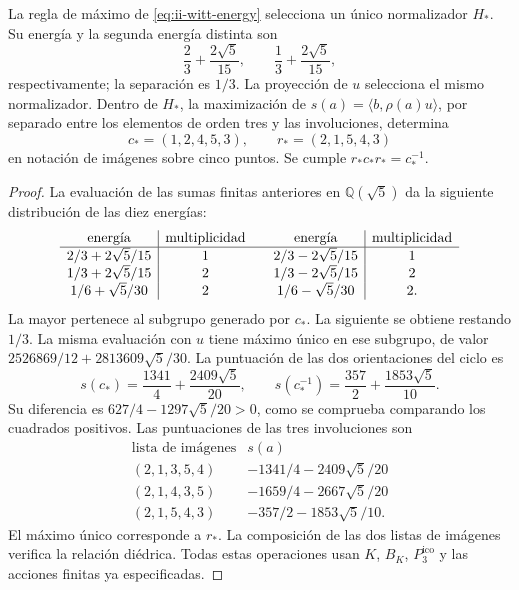 \begin{proposition}
\label{prop:ii-witt-variational-selection}
La regla de máximo de \eqref{eq:ii-witt-energy} selecciona un único
normalizador \(H_*\). Su energía y la segunda energía distinta son
\[
 \frac23+\frac{2\sqrt5}{15},\qquad
 \frac13+\frac{2\sqrt5}{15},
\]
respectivamente; la separación es \(1/3\). La proyección de \(u\)
selecciona el mismo normalizador. Dentro de \(H_*\), la maximización de
\(s(a)=\langle b,\rho(a)u\rangle\), por separado entre los elementos
de orden tres y las involuciones, determina
\[
 c_*=(1,2,4,5,3),\qquad r_*=(2,1,5,4,3)
\]
en notación de imágenes sobre cinco puntos. Se cumple
\(r_*c_*r_*=c_*^{-1}\).
\end{proposition}
\begin{proof}
La evaluación de las sumas finitas anteriores en \(\mathbb Q(\sqrt5)\)
da la siguiente distribución de las diez energías:
\[
\begin{array}{c|c@{\qquad}c|c}
\text{energía}&\text{multiplicidad}&\text{energía}&\text{multiplicidad}\\ \hline
2/3+2\sqrt5/15&1&2/3-2\sqrt5/15&1\\
1/3+2\sqrt5/15&2&1/3-2\sqrt5/15&2\\
1/6+\sqrt5/30&2&1/6-\sqrt5/30&2.
\end{array}
\]
La mayor pertenece al subgrupo generado por \(c_*\). La siguiente se
obtiene restando \(1/3\). La misma evaluación con \(u\) tiene máximo
único en ese subgrupo, de valor
\(2526869/12+2813609\sqrt5/30\).
La puntuación de las dos orientaciones del ciclo es
\[
 s(c_*)=\frac{1341}{4}+\frac{2409\sqrt5}{20},\qquad
 s(c_*^{-1})=\frac{357}{2}+\frac{1853\sqrt5}{10}.
\]
Su diferencia es \(627/4-1297\sqrt5/20>0\), como se comprueba
comparando los cuadrados positivos. Las puntuaciones de las tres
involuciones son
\[
\begin{array}{c|c}
\text{lista de imágenes}&s(a)\\ \hline
(2,1,3,5,4)&-1341/4-2409\sqrt5/20\\
(2,1,4,3,5)&-1659/4-2667\sqrt5/20\\
(2,1,5,4,3)&-357/2-1853\sqrt5/10.
\end{array}
\]
El máximo único corresponde a \(r_*\). La composición de las dos listas de
imágenes verifica la relación diédrica. Todas estas operaciones usan
\(K\), \(B_K\), \(P_3^{\mathrm{ico}}\) y las acciones finitas ya especificadas.
\end{proof}

